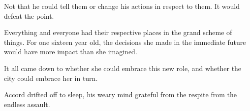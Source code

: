 Not that he could tell them or change his actions in respect to them.  It would defeat the point.



Everything and everyone had their respective places in the grand scheme of things.  For one sixteen year old, the decisions she made in the immediate future would have more impact than she imagined.



It all came down to whether she could embrace this new role, and whether the city could embrace her in turn.



Accord drifted off to sleep, his weary mind grateful from the respite from the endless assault.





